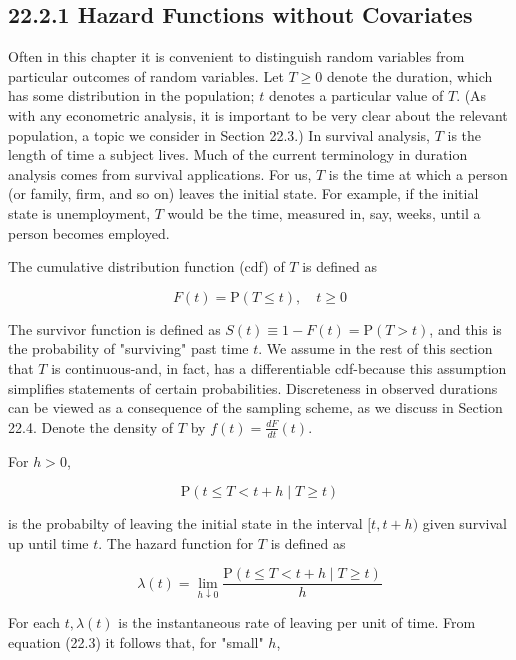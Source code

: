 \documentclass[10pt]{article}
\begin{document}
\subsection*{22.2.1 Hazard Functions without Covariates}
Often in this chapter it is convenient to distinguish random variables from particular outcomes of random variables. Let $T \geq 0$ denote the duration, which has some distribution in the population; $t$ denotes a particular value of $T$. (As with any econometric analysis, it is important to be very clear about the relevant population, a topic we consider in Section 22.3.) In survival analysis, $T$ is the length of time a subject lives. Much of the current terminology in duration analysis comes from survival applications. For us, $T$ is the time at which a person (or family, firm, and so on) leaves the initial state. For example, if the initial state is unemployment, $T$ would be the time, measured in, say, weeks, until a person becomes employed.

The cumulative distribution function (cdf) of $T$ is defined as


\begin{equation*}
F(t)=\mathrm{P}(T \leq t), \quad t \geq 0 \tag{22.1}
\end{equation*}


The survivor function is defined as $S(t) \equiv 1-F(t)=\mathrm{P}(T>t)$, and this is the probability of "surviving" past time $t$. We assume in the rest of this section that $T$ is continuous-and, in fact, has a differentiable cdf-because this assumption simplifies statements of certain probabilities. Discreteness in observed durations can be viewed as a consequence of the sampling scheme, as we discuss in Section 22.4. Denote the density of $T$ by $f(t)=\frac{d F}{d t}(t)$.

For $h>0$,


\begin{equation*}
\mathrm{P}(t \leq T<t+h \mid T \geq t) \tag{22.2}
\end{equation*}


is the probabilty of leaving the initial state in the interval $[t, t+h)$ given survival up until time $t$. The hazard function for $T$ is defined as


\begin{equation*}
\lambda(t)=\lim _{h \downarrow 0} \frac{\mathrm{P}(t \leq T<t+h \mid T \geq t)}{h} \tag{22.3}
\end{equation*}


For each $t, \lambda(t)$ is the instantaneous rate of leaving per unit of time. From equation (22.3) it follows that, for "small" $h$,
\end{document}
